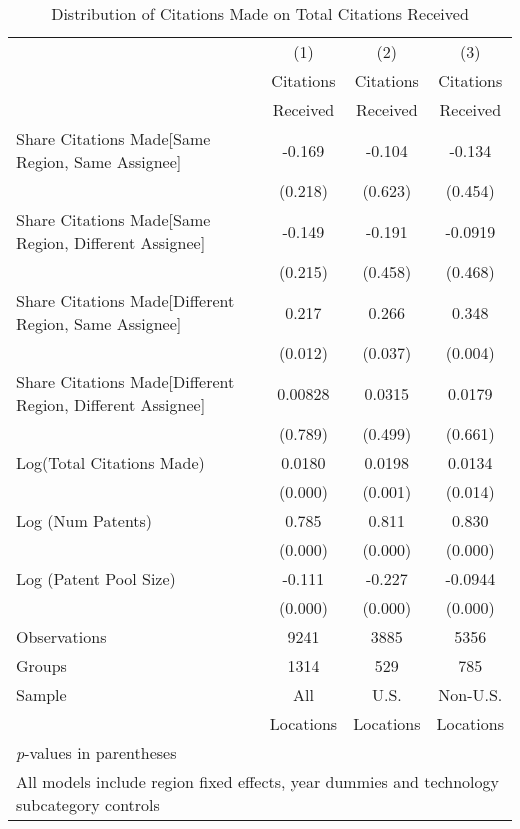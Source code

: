 {
\def\sym#1{\ifmmode^{#1}\else\(^{#1}\)\fi}
\begin{longtable}{l*{3}{c}}
\caption{Distribution of Citations Made on Total Citations Received \label{model123}}\\
\hline\hline\endfirsthead\hline\endhead\hline\endfoot\endlastfoot
                &\multicolumn{1}{c}{(1)}&\multicolumn{1}{c}{(2)}&\multicolumn{1}{c}{(3)}\\
                &\multicolumn{1}{c}{Citations}&\multicolumn{1}{c}{Citations}&\multicolumn{1}{c}{Citations}\\
                 &\multicolumn{1}{c}{Received}&\multicolumn{1}{c}{Received}&\multicolumn{1}{c}{Received}\\
\hline
Share Citations Made[Same Region, Same Assignee]&   -0.169         &   -0.104         &   -0.134         \\
                &  (0.218)         &  (0.623)         &  (0.454)         \\
Share Citations Made[Same Region, Different Assignee]&   -0.149         &   -0.191         &  -0.0919         \\
                &  (0.215)         &  (0.458)         &  (0.468)         \\
Share Citations Made[Different Region, Same Assignee]&    0.217  &    0.266  &    0.348 \\
                &  (0.012)         &  (0.037)         &  (0.004)         \\
Share Citations Made[Different Region, Different Assignee]&  0.00828         &   0.0315         &   0.0179         \\
                &  (0.789)         &  (0.499)         &  (0.661)         \\
Log(Total Citations Made)&   0.0180&   0.0198&   0.0134  \\
                &  (0.000)         &  (0.001)         &  (0.014)         \\
Log (Num Patents)&    0.785&    0.811&    0.830\\
                &  (0.000)         &  (0.000)         &  (0.000)         \\
Log (Patent Pool Size)&   -0.111&   -0.227&  -0.0944\\
                &  (0.000)         &  (0.000)         &  (0.000)         \\
\hline
Observations&9241&3885&5356         \\
Groups&1314&529&785\\
Sample&All &U.S. &Non-U.S. \\
          &Locations &Locations&Locations \\
\hline\hline
\multicolumn{4}{l}{\footnotesize \textit{p}-values in parentheses}\\
\multicolumn{4}{l}{\footnotesize All models include region fixed effects, year dummies and technology subcategory controls}\\
\end{longtable}
}
